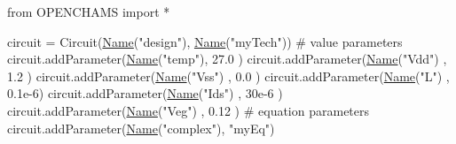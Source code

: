 \begin{DoxyCodeInclude}
\textcolor{keyword}{from} OPENCHAMS \textcolor{keyword}{import} *

circuit = Circuit(\hyperlink{class_name}{Name}(\textcolor{stringliteral}{"design"}), \hyperlink{class_name}{Name}(\textcolor{stringliteral}{"myTech"}))
\textcolor{comment}{# value parameters}
circuit.addParameter(\hyperlink{class_name}{Name}(\textcolor{stringliteral}{"temp"}), 27.0  )
circuit.addParameter(\hyperlink{class_name}{Name}(\textcolor{stringliteral}{"Vdd"}) , 1.2   )
circuit.addParameter(\hyperlink{class_name}{Name}(\textcolor{stringliteral}{"Vss"}) , 0.0   )
circuit.addParameter(\hyperlink{class_name}{Name}(\textcolor{stringliteral}{"L"})   , 0.1e-6)
circuit.addParameter(\hyperlink{class_name}{Name}(\textcolor{stringliteral}{"Ids"}) , 30e-6 )
circuit.addParameter(\hyperlink{class_name}{Name}(\textcolor{stringliteral}{"Veg"}) , 0.12  )
\textcolor{comment}{# equation parameters}
circuit.addParameter(\hyperlink{class_name}{Name}(\textcolor{stringliteral}{"complex"}), \textcolor{stringliteral}{"myEq"})


\end{DoxyCodeInclude}
